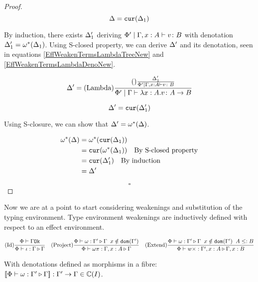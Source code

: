 \documentclass{Report}
\begin{document}
\begin{proof}
    \begin{equation}\label{EffWeakenTermsLambdaDeno}
        \Delta = \texttt{cur}(\Delta_1)\\
    \end{equation}

    By induction, there exists $\Delta_1'$ deriving $\Phi'\mid\Gamma, x: A \vdash v \colon B$ with denotation $\Delta_1' = \omega^*(\Delta_1)$. Using S-closed property, we can derive $\Delta'$ and its denotation, seen in equations \ref{EffWeakenTermsLambdaTreeNew} and \ref{EffWeakenTermsLambdaDenoNew}.

    \begin{equation}
        \label{EffWeakenTermsLambdaTreeNew}
        \Delta' = (\text{Lambda}) \frac{
            (\text{}) \frac{\Delta_1'}{\Phi'\mid\Gamma, x: A \vdash v \colon B}
        }{\Phi'\mid\Gamma \vdash \lambda x : A. v \colon A\rightarrow B}
    \end{equation}


    \begin{equation}\label{EffWeakenTermsLambdaDenoNew}
        \Delta' = \texttt{cur}(\Delta_1')\\
    \end{equation}

    Using S-closure, we can show that $\Delta' = \omega^*(\Delta)$.

    \begin{align}
        \omega^*(\Delta) & = \omega^*(\texttt{cur}(\Delta_1))\\
        & = \texttt{cur}(\omega^*(\Delta_1))\quad\text{By S-closed property}\\
        & = \texttt{cur}(\Delta_1')\quad\text{By induction}\\
        & = \Delta'
    \end{align}

    $$\square$$

\end{proof}




Now we are at a point to start considering weakenings and substitution of the typing environment. Type environment weakenings are inductively defined with respect to an effect environment.


\[
    (\text{Id}) \frac{\Phi\vdash \Gamma \texttt{Ok}}{\Phi\vdash \iota : \Gamma \triangleright \Gamma}
    \quad  
    (\text{Project}) \frac{\Phi\vdash \omega : \Gamma' \triangleright \Gamma\;\; x \notin \texttt{dom}(\Gamma')}{\Phi\vdash \omega \pi : \Gamma, x: A \triangleright \Gamma}
    \quad
    (\text{Extend}) \frac{\Phi\vdash \omega : \Gamma' \triangleright \Gamma\;\; x \notin \texttt{dom}(\Gamma')\;\; A \leq: B}{\Phi\vdash w \times : \Gamma', x: A \triangleright \Gamma, x: B}
\]

With denotations defined as morphisms in a fibre: ${\bf [\![}\Phi\vdash \omega : \Gamma' \triangleright \Gamma{\bf ]\!]}: \Gamma' \rightarrow \Gamma \in \mathbb{C}(I)$.
\end{document}
